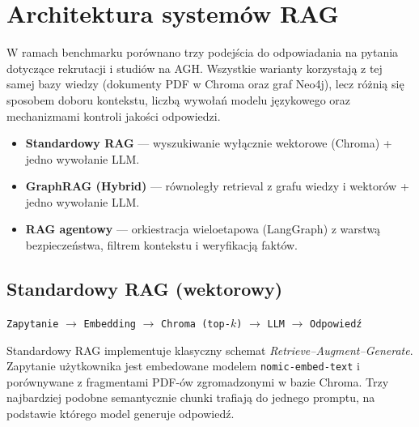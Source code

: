 
\section*{Architektura systemów RAG}

W ramach benchmarku porównano trzy podejścia do odpowiadania na pytania dotyczące rekrutacji i studiów na AGH.
Wszystkie warianty korzystają z tej samej bazy wiedzy (dokumenty PDF w Chroma oraz graf Neo4j), lecz różnią się
sposobem doboru kontekstu, liczbą wywołań modelu językowego oraz mechanizmami kontroli jakości odpowiedzi.

\begin{tcolorbox}[colback=blue!5!white,colframe=blue!75!black,title=Zakres porównania]
    \begin{itemize}[leftmargin=*, nosep]
        \item \textbf{Standardowy RAG} --- wyszukiwanie wyłącznie wektorowe (Chroma) + jedno wywołanie LLM.
        \item \textbf{GraphRAG (Hybrid)} --- równoległy retrieval z grafu wiedzy i wektorów + jedno wywołanie LLM.
        \item \textbf{RAG agentowy} --- orkiestracja wieloetapowa (LangGraph) z warstwą bezpieczeństwa, filtrem kontekstu i weryfikacją faktów.
    \end{itemize}
\end{tcolorbox}

\vspace{1em}

\subsection*{Standardowy RAG (wektorowy)}

\begin{tcolorbox}[colback=gray!5!white,colframe=gray!60!black,title=Przepływ danych --- pipeline liniowy]
    \centering
    \texttt{Zapytanie} $\rightarrow$ \texttt{Embedding} $\rightarrow$ \texttt{Chroma (top-$k$)} $\rightarrow$ \texttt{LLM} $\rightarrow$ \texttt{Odpowiedź}
\end{tcolorbox}

\noindent
Standardowy RAG implementuje klasyczny schemat \textit{Retrieve--Augment--Generate}.
Zapytanie użytkownika jest embedowane modelem \texttt{nomic-embed-text} i porównywane z fragmentami
PDF-ów zgromadzonymi w bazie Chroma. Trzy najbardziej podobne semantycznie chunki trafiają do jednego
promptu, na podstawie którego model generuje odpowiedź.

